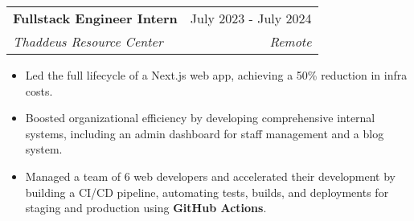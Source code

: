\documentclass[letterpaper,11pt]{article}
\makeatletter
\newcommand{\resumeItem}[1]{
  \item\setstretch{.95}\small{
    {#1 \vspace{-2pt}}
  }
}
\newcommand{\resumeSubheading}[4]{
  \vspace{-2pt}\item
    \begin{tabular*}{0.97\textwidth}[t]{l@{\extracolsep{\fill}}r}
      \textbf{#1} & #2 \\
      \textit{\small#3} & \textit{\small #4} \\
    \end{tabular*}\vspace{-4.8pt}
}
\newcommand{\resumeItemListStart}{\begin{itemize}}
\newcommand{\resumeItemListEnd}{\end{itemize}\vspace{-5pt}}
\makeatother
\begin{document}

\resumeSubheading
{Fullstack Engineer Intern}{July 2023 - July 2024}
{Thaddeus Resource Center}{Remote}
\resumeItemListStart
\resumeItem{Led the full lifecycle of a Next.js web app, achieving a 50\% reduction in infra costs.}
\resumeItem{Boosted organizational efficiency by developing comprehensive internal systems, including an admin dashboard for staff management and a blog system.}
\resumeItem{Managed a team of 6 web developers and accelerated their development by building a CI/CD pipeline, automating tests, builds, and deployments for staging and production using \textbf{GitHub Actions}.}
\resumeItemListEnd
\end{document}
